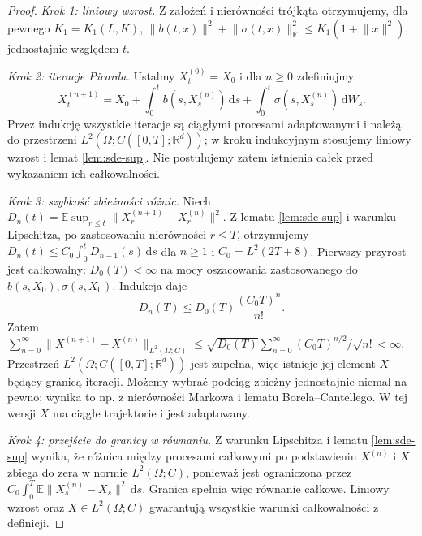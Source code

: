 \documentclass[11pt,a4paper,oneside]{report}
\numberwithin{equation}{chapter}
\theoremstyle{plain}
\theoremstyle{definition}
\theoremstyle{remark}
\newcommand{\R}{\mathbb{R}}
\newcommand{\E}{\mathbb{E}}
\newcommand{\dd}{\mathrm{d}}
\newcommand{\norm}[1]{\lVert #1\rVert}
\begin{document}
\begin{proof}
\emph{Krok 1: liniowy wzrost.} Z założeń i nierówności
trójkąta otrzymujemy, dla pewnego $K_1=K_1(L,K)$,
$\norm{b(t,x)}^2+\norm{\sigma(t,x)}_{\mathrm F}^2
\le K_1(1+\norm{x}^2)$, jednostajnie względem $t$.

\emph{Krok 2: iteracje Picarda.} Ustalmy $X^{(0)}_t=X_0$
i dla $n\ge0$ zdefiniujmy
\[
X_t^{(n+1)}=X_0+\int_0^tb(s,X_s^{(n)})\,\dd s
+\int_0^t\sigma(s,X_s^{(n)})\,\dd W_s.
\tag{5.4}\label{eq:sde-picard}
\]
Przez indukcję wszystkie iteracje są ciągłymi procesami
adaptowanymi i należą do przestrzeni
$L^2(\Omega;C([0,T];\R^d))$; w kroku indukcyjnym
stosujemy liniowy wzrost i lemat \ref{lem:sde-sup}.
Nie postulujemy zatem istnienia całek przed wykazaniem
ich całkowalności.

\emph{Krok 3: szybkość zbieżności różnic.}
Niech $D_n(t)=\E\sup_{r\le t}
\norm{X_r^{(n+1)}-X_r^{(n)}}^2$.
Z lematu \ref{lem:sde-sup} i warunku Lipschitza,
po zastosowaniu nierówności $r\le T$, otrzymujemy
$D_n(t)\le C_0\int_0^t D_{n-1}(s)\,\dd s$
dla $n\ge1$ i $C_0=L^2(2T+8)$.
Pierwszy przyrost jest całkowalny:
$D_0(T)<\infty$ na mocy oszacowania zastosowanego
do $b(s,X_0),\sigma(s,X_0)$. Indukcja daje
\[
D_n(T)\le D_0(T)\frac{(C_0T)^n}{n!}.
\tag{5.5}\label{eq:picard-factorial}
\]
Zatem
$\sum_{n=0}^\infty\|X^{(n+1)}-X^{(n)}\|_{L^2(\Omega;C)}
\le\sqrt{D_0(T)}\sum_{n=0}^\infty(C_0T)^{n/2}/\sqrt{n!}<\infty$.
Przestrzeń $L^2(\Omega;C([0,T];\R^d))$ jest zupełna,
więc istnieje jej element $X$ będący granicą iteracji.
Możemy wybrać podciąg zbieżny jednostajnie niemal
na pewno; wynika to np. z nierówności Markowa i
lematu Borela--Cantellego. W tej wersji $X$ ma
ciągłe trajektorie i jest adaptowany.

\emph{Krok 4: przejście do granicy w równaniu.}
Z warunku Lipschitza i lematu \ref{lem:sde-sup}
wynika, że różnica między procesami całkowymi po
podstawieniu $X^{(n)}$ i $X$ zbiega do zera
w normie $L^2(\Omega;C)$, ponieważ jest ograniczona
przez $C_0\int_0^T\E\norm{X_s^{(n)}-X_s}^2\,\dd s$.
Granica spełnia więc równanie całkowe. Liniowy
wzrost oraz $X\in L^2(\Omega;C)$ gwarantują
wszystkie warunki całkowalności z definicji.


\end{proof}
\end{document}
